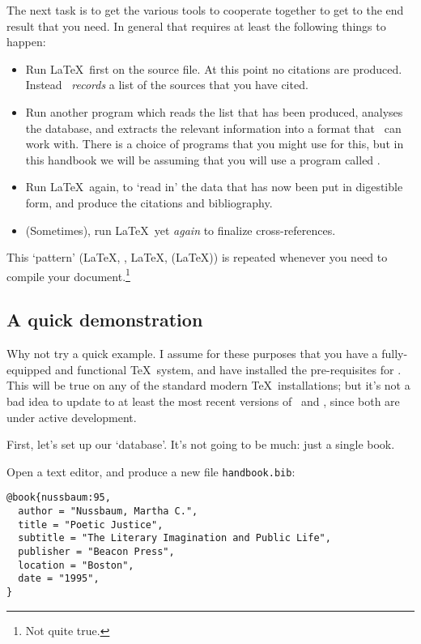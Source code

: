 The next task is to get the various tools to cooperate together to get to the end result that you need. In general that requires at least the following things to happen:
\begin{itemize}
\item Run \LaTeX\ first on the source file. At this point no citations are produced. Instead \biblatex\ \emph{records} a list of the sources that you have cited.
\item Run another program which reads the list that has been produced, analyses the database, and extracts the relevant information into a format that \biblatex\ can work with. There is a choice of programs that you might use for this, but in this handbook we will be assuming that you will use a program called .
\item Run \LaTeX\ again, to `read in' the data that has now been put in digestible form, and produce the citations and bibliography.
\item (Sometimes), run \LaTeX\ yet \emph{again} to finalize cross-references.
\end{itemize}

This `pattern' (\LaTeX, , \LaTeX, (\LaTeX)) is repeated whenever you need to compile your document.\footnote{Not quite true.}

\subsection{A quick demonstration\label{neophyte:example}}

Why not try a quick example. I assume for these purposes that you have a fully-equipped and functional \TeX\ system, and have installed the pre-requisites for \biblatex. This will be true on any of the standard modern \TeX\ installations; but it's not a bad idea to update to at least the most recent versions of \biblatex\ and , since both are under active development.

First, let's set up our `database'. It's not going to be much: just a single book.

Open a text editor, and produce a new file \texttt{handbook.bib}:
\begin{verbatim}
@book{nussbaum:95,
  author = "Nussbaum, Martha C.",
  title = "Poetic Justice",
  subtitle = "The Literary Imagination and Public Life",
  publisher = "Beacon Press",
  location = "Boston",
  date = "1995",
}
\end{verbatim}

